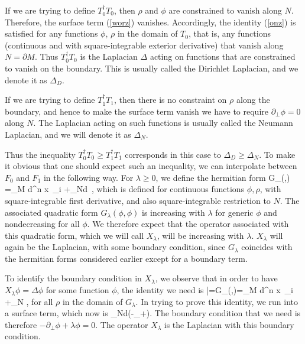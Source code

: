 \documentclass[12pt]{article}
\def\bar{\overline}
\def\ra{\rangle}
\def\la{\langle}
\numberwithin{equation}{section}
\def\d{\mathrm d}
\def\bar{\overline}
\def\bar{\overline}
\begin{document}
If we are trying to define $T^\dagger_0T_0$, then $\rho$ and $\phi$ are constrained to vanish along $N$.   Therefore, the surface term (\ref{worz}) vanishes.  Accordingly, the identity (\ref{onz}) is satisfied for any functions
$\phi$, $\rho$ in the domain of $T_0$, that is, any functions (continuous and with square-integrable exterior derivative) that vanish along $N=\partial M$.  Thus $T^\dagger_0 T_0$ is the Laplacian $\Delta$
acting on functions that are constrained to vanish on the boundary.  This is usually called the Dirichlet Laplacian, and we denote it as 
$\Delta_D$.


If we are trying to define $T^\dagger_1 T_1$, then there is no constraint on $\rho$ along the boundary, and hence to  make the surface term vanish we have to require $\partial_\perp \phi=0$ along $N$.   The Laplacian
acting on such functions is usually called the Neumann Laplacian, and we will denote it as $\Delta_N$.   

Thus the inequality $T_0^\dagger T_0\geq T_1^\dagger T_1$ corresponds in this case to $\Delta_D\geq \Delta_N$.   To make it obvious that one should expect such an inequality, we can interpolate between $F_0$ and $F_1$
in the following way.  For $\lambda\geq 0$, we define the hermitian form
\be\label{ronz} G_\lambda(\phi,\rho) =\int_M \d^n x \,\sum_i \frac{\partial\bar \phi}{\partial x_i}  +\lambda\int_N\d\mu\, \bar\phi \rho, \ee
which is defined for continuous functions $\phi,\rho$, with square-integrable first derivative, and also square-integrable restriction to $N$.
The associated quadratic form  $G_\lambda(\phi,\phi)$ is increasing with $\lambda$ for generic $\phi$ and nondecreasing for all $\phi$.
We therefore expect that the operator  associated with this quadratic form, which we will call $X_\lambda$,
 will be increasing with $\lambda$.  $X_\lambda$ will again be the Laplacian, with some boundary condition, since $G_\lambda$ coincides
with the hermitian forms considered earlier except for a boundary term.    

To identify the boundary condition in $X_\lambda$, we observe that in order to have $X_\lambda\phi=\Delta\phi$ for some function $\phi$, the identity we need is
\be\label{thid} \la \Delta\phi|\rho\ra =G_\lambda(\phi,\rho)=\int_M \d^n x \,\sum_i \frac{\partial\bar \phi}{\partial x_i}  +\lambda\int_N \bar\phi \rho, \ee
for all $\rho$ in the domain of $G_\lambda$.  In trying to prove this identity, we run into a surface term, which now is
\be\label{nid}\int_N\d\mu(-\partial_\perp \bar\phi +\lambda\bar\phi)\rho. \ee
The boundary condition that we need is therefore $-\partial_\perp \phi+\lambda\phi=0$.    The operator $X_\lambda$ is the Laplacian with this boundary condition.  
\end{document}
